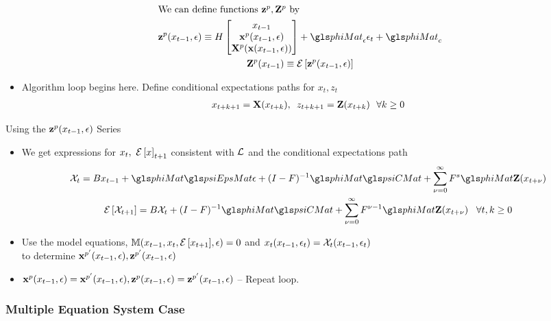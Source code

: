 \documentclass[12pt]{article}
\begin{document}
\begin{gather*}
 \intertext{We can define functions $\zpWOarg,\ZpWOarg$ by}
\zpWarg\equiv H
\begin{bmatrix}
x_{t-1}\\ \xpWarg\\ \XpWOarg(\xWarg)
\end{bmatrix}+\phiMat_\epsilon \epsilon_t+\phiMat_c\\
\ZpWOarg(x_{t-1})\equiv \expct{\zpWarg}
\end{gather*}
 \begin{itemize}
\item  {\color{blue}Algorithm loop begins here.} Define conditional expectations paths for $x_t, z_t$ 
 \begin{gather*}
 x_{t+k+1}=\mathbf{X}(x_{t+k}),\,\,\,z_{t+k+1}=\mathbf{Z}(x_{t+k})\,\,\,\,  \forall k\ge 0      \end{gather*}
   \end{itemize}

{Using the $\mathbf{z}^p(x_{t-1},\epsilon)$ Series}
{\small
  \begin{itemize}
  \item We get expressions for $x_t,\,\, {\mathcal{E}\left [ x \right ]}_{t+1}$ consistent with ${\mathcal{L}}$ and the conditional expectations path
   \begin{gather*}
     \mathcal{X}_{t} =B x_{t-1}+ \phiMat \psiEpsMat\epsilon + (I - F)^{-1} \phiMat \psiCMat + \sum_{\sForSum=0}^\infty F^s \phiMat \ZWOarg(x_{t+\nu})\\
	\expct{ \mathcal{X}_{t+1}} =B \mathcal{X}_{t}  + (I - F)^{-1} \phiMat \psiCMat+ \sum_{\sForSum =0}^\infty F^{\sForSum-1} \phiMat \ZWOarg(x_{t+\nu}) \,\,\,\,\,\forall t,k \ge  0
\end{gather*}
\item Use the model equations, $\mathbb{M}(x_{t-1},x_t,{\mathcal{E}\left [ x_{t+1} \right ]},\epsilon)=0$ and $x_t(x_{t-1},\epsilon_t)=\mathcal{X}_t(x_{t-1},\epsilon_t)$\\ to determine $\mathbf{x}^{p'}(x_{t-1},\epsilon), \mathbf{z}^{p'}(x_{t-1},\epsilon)$
\item $\mathbf{x}^p(x_{t-1},\epsilon)=\mathbf{x}^{p'}(x_{t-1},\epsilon), \mathbf{z}^p(x_{t-1},\epsilon)=\mathbf{z}^{p'}(x_{t-1},\epsilon)$ -- {\color{blue}Repeat loop.}
  \end{itemize}
}

\subsubsection{Multiple Equation System Case}
\end{document}
